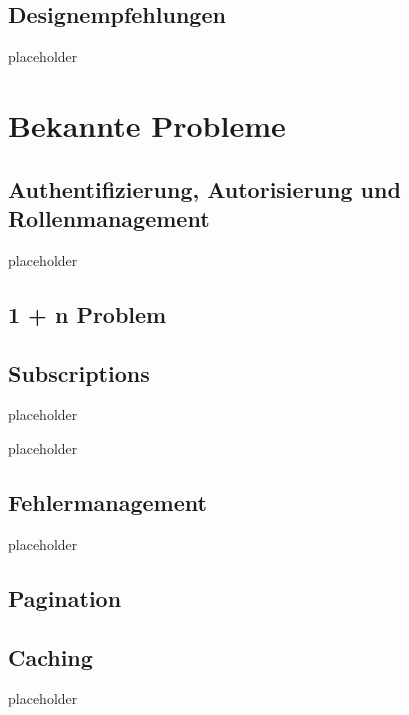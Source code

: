 

\subsection{Designempfehlungen}

placeholder
\pagebreak

\section{Bekannte Probleme}

\subsection{Authentifizierung, Autorisierung und Rollenmanagement}

placeholder
\pagebreak

\subsection{1 + n Problem}

\subsection{Subscriptions}

placeholder
\pagebreak

placeholder
\pagebreak

\subsection{Fehlermanagement}

placeholder
\pagebreak

\subsection{Pagination}

\subsection{Caching}

placeholder
\pagebreak
